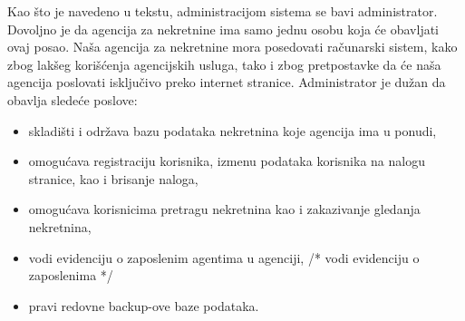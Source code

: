 \documentclass[20pt]{article}
\begin{document}
\indent Kao \v {s}to je navedeno u tekstu, administracijom sistema se bavi administrator. Dovoljno je da agencija za nekretnine ima samo jednu osobu koja \' ce obavljati ovaj posao. Na\v {s}a agencija za nekretnine mora posedovati ra\v {c}unarski sistem, kako zbog lak\v {s}eg kori\v {s}\' cenja agencijskih usluga, tako i zbog pretpostavke da \'ce na\v {s}a agencija poslovati isklju\v {c}ivo preko internet stranice. Administrator je du\v {z}an da obavlja slede\' ce poslove:
\begin{itemize}
    \item skladi\v {s}ti i odr\v {z}ava bazu podataka nekretnina koje agencija ima u ponudi,
    \item omogu\' cava registraciju korisnika, izmenu podataka korisnika na nalogu stranice, kao i brisanje naloga,
    \item omogu\' cava korisnicima pretragu nekretnina kao i zakazivanje gledanja nekretnina,
    \item vodi evidenciju o zaposlenim agentima u agenciji, /* vodi evidenciju o zaposlenima */
    \item pravi redovne backup-ove baze podataka.
\end{itemize}

\newpage
\end{document}
